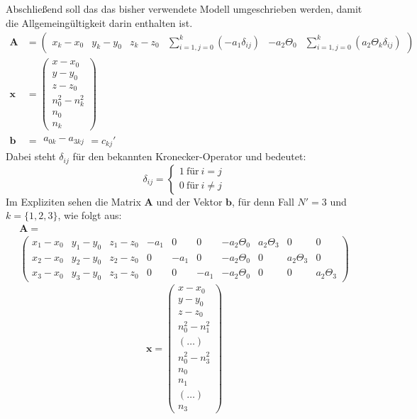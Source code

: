 {
Abschließend soll das das bisher verwendete Modell umgeschrieben werden, damit die Allgemeingültigkeit darin enthalten ist.
\begin{align}
%
%
\mathbf{A}&=
\left(
	\begin{array}{cccccc}
		x_k-x_0 & y_k-y_0 & z_k-z_0 & \sum_{i=1,j=0}^{k}(-a_1\delta_{ij}) &  -a_2\Theta_0 & \sum_{i=1,j=0}^{k}(a_2\Theta_k\delta_{ij})
	\end{array}
\right)\nonumber\\
%
\mathbf{x}&=
\left(
   \begin{array}{c}
	   x-x_0\\
	   y-y_0\\
	   z-z_0\\
	   n_0^2-n_k^2\\
	   n_0\\
	   n_k
   \end{array}
\right)\nonumber\\
%
\mathbf{b}&=
	\begin{array}{c}
		a_{0k}-a_{3kj} 
	\end{array}
	= c_{kj}'\nonumber
\end{align}
%
Dabei steht $\delta_{ij}$ für den bekannten Kronecker-Operator und bedeutet:
\begin{equation*}
\delta_{ij} = \begin{cases}1 ~\text{für}~ i=j\\ 0 ~\text{für}~ i\neq j\end{cases}
\end{equation*}
%
Im Expliziten sehen die Matrix $\mathbf{A}$ und der Vektor $\mathbf{b}$, für denn Fall $N'=3$ und $k=\{1,2,3\}$, wie folgt aus:
%
\begin{multline}
\mathbf{A}=\\
\left(
	\begin{array}{cccccccccc}
		x_1-x_0 & y_1-y_0 & z_1-z_0 & -a_1 & 0 & 0 & -a_2\Theta_0 & a_2\Theta_3 & 0 & 0 \\
		x_2-x_0 & y_2-y_0 & z_2-z_0 & 0 & -a_1 & 0 & -a_2\Theta_0& 0 & a_2\Theta_3 & 0 \\
		x_3-x_0 & y_3-y_0 & z_3-z_0 & 0 & 0 & -a_1 & -a_2\Theta_0& 0 & 0 & a_2\Theta_3
	\end{array}
\right) \nonumber
\end{multline}
%
\begin{equation}
\mathbf{x}=
\left(
	\begin{array}{c}
		x-x_0	\\
		y-y_0	\\
		z-z_0	\\
		n_0^2-n_1^2	\\
		(\dots)	\\
		n_0^2-n_3^2	\\
		n_0 \\
		n_1	\\
		(\dots)	\\
		n_3	
	\end{array}
\right)\nonumber
\end{equation}
%
}
